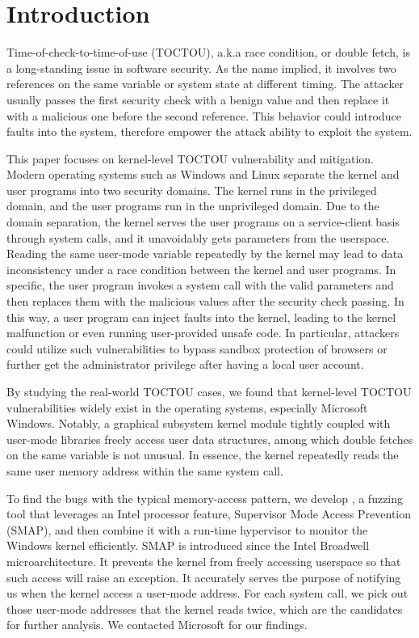 
\section{Introduction}
\label{sec:ktoctou-introduction}

Time-of-check-to-time-of-use (TOCTOU), a.k.a race condition, or double fetch, is a long-standing issue in software security. As the name implied, it involves two references on the same variable or system state at different timing. The attacker usually passes the first security check with a benign value and then replace it with a malicious one before the second reference. This behavior could introduce faults into the system, therefore empower the attack ability to exploit the system.

This paper focuses on kernel-level TOCTOU vulnerability and mitigation. Modern operating systems such as Windows and Linux separate the kernel and user programs into two security domains. The kernel runs in the privileged domain, and the user programs run in the unprivileged domain. Due to the domain separation, the kernel serves the user programs on a service-client basis through system calls, and it unavoidably gets parameters from the userspace. Reading the same user-mode variable repeatedly by the kernel may lead to data inconsistency under a race condition between the kernel and user programs. In specific, the user program invokes a system call with the valid parameters and then replaces them with the malicious values after the security check passing. In this way, a user program can inject faults into the kernel, leading to the kernel malfunction or even running user-provided unsafe code. In particular, attackers could utilize such vulnerabilities to bypass sandbox protection of browsers or further get the administrator privilege after having a local user account.

By studying the real-world TOCTOU cases,  we found that kernel-level TOCTOU vulnerabilities widely exist in the operating systems, especially Microsoft Windows. Notably, a graphical subsystem kernel module tightly coupled with user-mode libraries freely access user data structures, among which double fetches on the same variable is not unusual. In essence, the kernel repeatedly reads the same user memory address within the same system call.

To find the bugs with the typical memory-access pattern, we develop \toolname, a fuzzing tool that leverages an Intel processor feature, Supervisor Mode Access Prevention (SMAP), and then combine it with a run-time hypervisor to monitor the Windows kernel efficiently. SMAP is introduced since the Intel Broadwell microarchitecture. It prevents the kernel from freely accessing userspace so that such access will raise an exception. It accurately serves the purpose of notifying us when the kernel access a user-mode address. For each system call, we pick out those user-mode addresses that the kernel reads twice, which are the candidates for further analysis. We contacted Microsoft for our findings.

